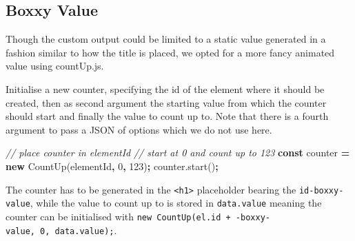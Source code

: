 \documentclass[
]{krantz}
\makeatletter
\newenvironment{Shaded}{\begin{snugshade}}{\end{snugshade}}
\newcommand{\AttributeTok}[1]{\textcolor[rgb]{0.61,0.61,0.61}{#1}}
\newcommand{\CommentTok}[1]{\textcolor[rgb]{0.37,0.37,0.37}{\textit{#1}}}
\newcommand{\DecValTok}[1]{\textcolor[rgb]{0.06,0.06,0.06}{#1}}
\newcommand{\KeywordTok}[1]{\textcolor[rgb]{0.27,0.27,0.27}{\textbf{#1}}}
\newcommand{\NormalTok}[1]{#1}
\newcommand{\OperatorTok}[1]{\textcolor[rgb]{0.43,0.43,0.43}{\textbf{#1}}}
\newcommand{\StringTok}[1]{\textcolor[rgb]{0.5,0.5,0.5}{#1}}
\newcommand{\VariableTok}[1]{\textcolor[rgb]{0,0,0}{#1}}
\newenvironment{kframe}{%
\medskip{}
\setlength{\fboxsep}{.8em}
 \def\at@end@of@kframe{}%
 \ifinner\ifhmode%
  \def\at@end@of@kframe{\end{minipage}}%
  \begin{minipage}{\columnwidth}%
 \fi\fi%
 \def\FrameCommand##1{\hskip\@totalleftmargin \hskip-\fboxsep
 \colorbox{shadecolor}{##1}\hskip-\fboxsep
     \hskip-\linewidth \hskip-\@totalleftmargin \hskip\columnwidth}%
 \MakeFramed {\advance\hsize-\width
   \@totalleftmargin\z@ \linewidth\hsize
   \@setminipage}}%
 {\par\unskip\endMakeFramed%
 \at@end@of@kframe}
\renewenvironment{Shaded}{\begin{kframe}}{\end{kframe}}
\makeatother
\begin{document}
\hypertarget{shiny-output-boxxy-value}{%
\subsection{Boxxy Value}\label{shiny-output-boxxy-value}}

Though the custom output could be limited to a static value generated in a fashion similar to how the title is placed, we opted for a more fancy animated value using countUp.js.

Initialise a new counter, specifying the id of the element where it should be created, then as second argument the starting value from which the counter should start and finally the value to count up to. Note that there is a fourth argument to pass a JSON of options which we do not use here.

\begin{Shaded}
\begin{Highlighting}[]
\CommentTok{// place counter in elementId}
\CommentTok{// start at 0 and count up to 123}
\KeywordTok{const}\NormalTok{ counter }\OperatorTok{=} \KeywordTok{new} \AttributeTok{CountUp}\NormalTok{(}\StringTok{\textquotesingle{}elementId\textquotesingle{}}\OperatorTok{,} \DecValTok{0}\OperatorTok{,} \DecValTok{123}\NormalTok{)}\OperatorTok{;}
\VariableTok{counter}\NormalTok{.}\AttributeTok{start}\NormalTok{()}\OperatorTok{;}
\end{Highlighting}
\end{Shaded}

The counter has to be generated in the \texttt{\textless{}h1\textgreater{}} placeholder bearing the \texttt{id-boxxy-value}, while the value to count up to is stored in \texttt{data.value} meaning the counter can be initialised with \texttt{new\ CountUp(el.id\ +\ \textquotesingle{}-boxxy-value\textquotesingle{},\ 0,\ data.value);}.
\end{document}
